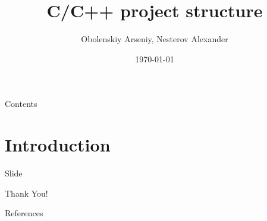 \documentclass{beamer}
\title[C/C++ project structure]{C/C++ project structure}
\author{Obolenskiy Arseniy, Nesterov Alexander}
\institute{ITLab}
\date{\today}
\begin{document}
\begin{frame}
    \titlepage%
\end{frame}

\begin{frame}{Contents}
    \tableofcontents
\end{frame}

\section{Introduction}

\begin{frame}{Slide}
\end{frame}

\begin{frame}
    \centering
    \Huge{Thank You!}
\end{frame}

\begin{frame}{References}
\end{frame}
\end{document}
